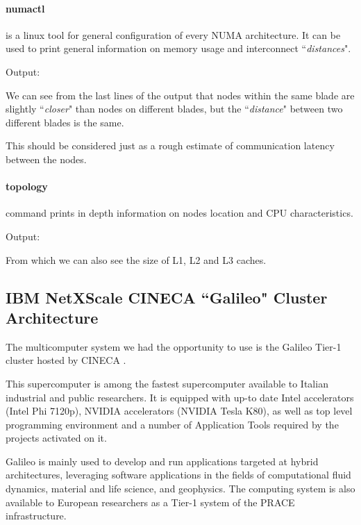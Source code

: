 \documentclass[a4paper,12pt]{article}
\begin{document}
\paragraph{numactl} is a linux tool for general configuration of every NUMA architecture.
It can be used to print general information on memory usage and interconnect ``\textit{distances}".

Output:




We can see from the last lines of the output that nodes within the same blade are slightly ``\textit{closer}" than nodes on different blades, but the ``\textit{distance}" between two different blades is the same.

This should be considered just as a rough estimate of communication latency between the nodes.

\paragraph{topology} command prints in depth information on nodes location and CPU characteristics.

Output:

From which we can also see the size of L1, L2 and L3 caches.


\subsection{IBM NetXScale CINECA ``Galileo" Cluster Architecture}\label{galileoarch:sec}

The multicomputer system we had the opportunity to use is the Galileo Tier-1 cluster hosted by CINECA \cite{Galileo}.

This supercomputer is among  the fastest supercomputer available to Italian industrial and public researchers. It is equipped with up-to date Intel accelerators (Intel Phi 7120p), NVIDIA accelerators (NVIDIA Tesla K80), as well as top level programming environment and a number of Application Tools required by the projects activated on it.

Galileo is mainly used to develop and run applications targeted at hybrid architectures, leveraging software applications in the fields of computational fluid dynamics, material and life science, and geophysics. The computing system is also available to European researchers as a Tier-1 system of the PRACE infrastructure.
\end{document}
